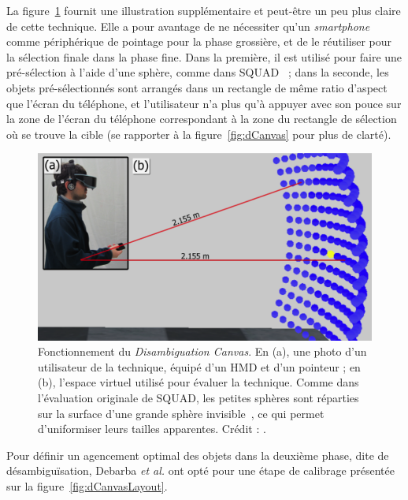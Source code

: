 	La figure~\ref{fig:dCanvas2} fournit une illustration supplémentaire et peut-être un peu plus claire de cette technique. Elle a pour avantage de ne nécessiter qu'un \emph{smartphone} comme périphérique de pointage pour la phase grossière, et de le réutiliser pour la sélection finale dans la phase fine. Dans la première, il est utilisé pour faire une pré-sélection à l'aide d'une sphère, comme dans SQUAD~\cite{kopper2011rapid} ; dans la seconde, les objets pré-sélectionnés sont arrangés dans un rectangle de même ratio d'aspect que l'écran du téléphone, et l'utilisateur n'a plus qu'à appuyer avec son pouce sur la zone de l'écran du téléphone correspondant à la zone du rectangle de sélection où se trouve la cible (se rapporter à la figure~\ref{fig:dCanvas} pour plus de clarté).
	
	\begin{figure}[!htb]
		\centering
		\includegraphics[width=\textwidth]{figures/ch2/dCanvas2}
		\caption[\emph{Disambiguation Canvas}, bis]{Fonctionnement du \emph{Disambiguation Canvas}. En (a), une photo d'un utilisateur de la technique, équipé d'un HMD et d'un pointeur ; en (b), l'espace virtuel utilisé pour évaluer la technique. Comme dans l'évaluation originale de SQUAD, les petites sphères sont réparties sur la surface d'une grande sphère invisible~\cite{kopper2011rapid}, ce qui permet d'uniformiser leurs tailles apparentes. Crédit : \cite{debarba2013disambiguation}.}
		\label{fig:dCanvas2}
	\end{figure}
	
	Pour définir un agencement optimal des objets dans la deuxième phase, dite de désambiguïsation, Debarba \emph{et al.} ont opté pour une étape de calibrage présentée sur la figure~\ref{fig:dCanvasLayout}.
	
